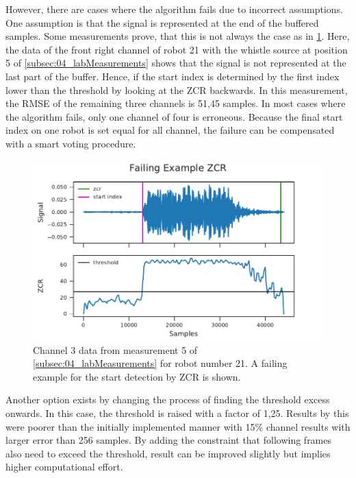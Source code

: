 However, there are cases where the algorithm fails due to incorrect assumptions.
One assumption is that the signal is represented at the end of the buffered
samples.
Some measurements prove, that this is not always the case as in \cref{fig:04_zcrFail}.
Here, the data of the front right channel of robot 21 with the whistle source
at position 5 of \cref{subsec:04_labMeasurements}
shows that the signal is not represented at the last part of the buffer.
Hence, if the start index is determined by the first index lower than
the threshold by looking at the \ac{ZCR} backwards.
In this measurement, the \ac{RMSE} of the remaining three channels is
51,45 samples.
In most cases where the algorithm fails, only one channel of four
is erroneous.
Because the final start index on one robot is set equal for all channel,
the failure can be compensated with a smart voting procedure.
\begin{figure}[ht]
	\centering
		\includegraphics[]{figures/evaluation/zcr_fail}
    \caption{Channel 3 data from measurement 5 of \cref{subsec:04_labMeasurements}
             for robot number 21. A failing example for the start detection by \ac{ZCR}
             is shown.}
	\label{fig:04_zcrFail}
\end{figure}

Another option exists by changing the process of finding the
threshold excess onwards.
In this case, the threshold is raised with a factor of 1,25.
Results by this were poorer than the initially implemented manner
with 15\si{\percent} channel results with larger error than 256 samples.
By adding the constraint that following frames also need to exceed the
threshold, result can be improved slightly but implies higher
computational effort.


